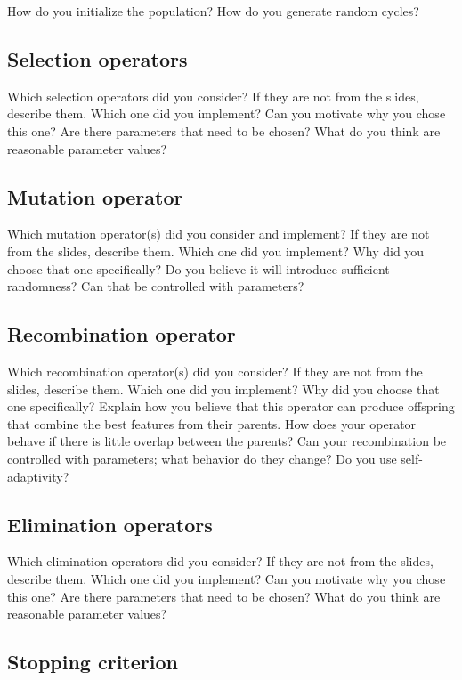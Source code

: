\documentclass[a4paper,10pt]{article}
\newcommand{\ReplaceMe}[1]{{\color{blue}#1}}
\begin{document}
\ReplaceMe{How do you initialize the population? How do you generate random cycles?}

\subsection{Selection operators}

\ReplaceMe{Which selection operators did you consider? If they are not from the slides, describe them. Which one did you implement? Can you motivate why you chose this one? Are there parameters that need to be chosen? What do you think are reasonable parameter values?}

\subsection{Mutation operator}

\ReplaceMe{Which mutation operator(s) did you consider and implement? If they are not from the slides, describe them. Which one did you implement? Why did you choose that one specifically? Do you believe it will introduce sufficient randomness? Can that be controlled with parameters?}

\subsection{Recombination operator}

\ReplaceMe{Which recombination operator(s) did you consider? If they are not from the slides, describe them. Which one did you implement? Why did you choose that one specifically? Explain how you believe that this operator can produce offspring that combine the best features from their parents. How does your operator behave if there is little overlap between the parents? Can your recombination be controlled with parameters; what behavior do they change? Do you use self-adaptivity?}

\subsection{Elimination operators}

\ReplaceMe{Which elimination operators did you consider? If they are not from the slides, describe them. Which one did you implement? Can you motivate why you chose this one? Are there parameters that need to be chosen? What do you think are reasonable parameter values?} 

\subsection{Stopping criterion}
\end{document}
